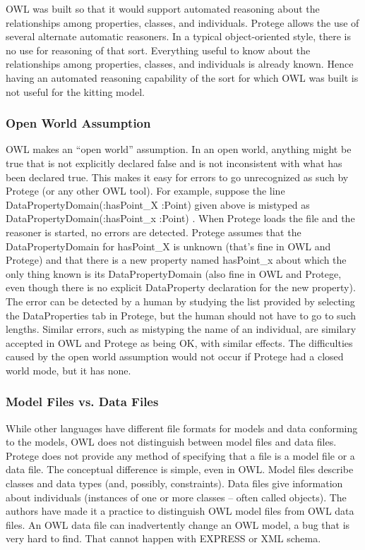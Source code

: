 OWL was built so that it would support automated reasoning about the
relationships among properties, classes, and individuals. Protege allows
the use of several alternate automatic reasoners. In a typical
object-oriented style, there is no use for reasoning of that sort.
Everything useful to know about the relationships among properties,
classes, and individuals is already known. Hence having an automated
reasoning capability of the sort for which OWL was built is not useful
for the kitting model.\\

\subsubsection{Open World Assumption}

OWL makes an ``open world'' assumption.  In an open world, anything might
be true that is not explicitly declared false and is not inconsistent with
what has been declared true. This makes it easy for errors to go
unrecognized as such by Protege (or any other OWL tool). For example,
suppose the line \sf DataPropertyDomain(:hasPoint\_X :Point) \rm given
above is mistyped as \sf DataPropertyDomain(:hasPoint\_x :Point) \rm. When
Protege loads the file and the reasoner is started, no errors are
detected. Protege assumes that the DataPropertyDomain for \sf hasPoint\_X
\rm is unknown (that's fine in OWL and Protege) and that there is a new
property named \sf hasPoint\_x \rm about which the only thing known is its
DataPropertyDomain (also fine in OWL and Protege, even though there is no
explicit DataProperty declaration for the new property). The error can be
detected by a human by studying the list provided by selecting the
DataProperties tab in Protege, but the human should not have to go to such
lengths. Similar errors, such as mistyping the name of an individual, are
similary accepted in OWL and Protege as being OK, with similar effects.
The difficulties caused by the open world assumption would not occur if
Protege had a closed world mode, but it has none.\\

\subsubsection{Model Files vs. Data Files}

While other languages have different file formats for models and
data conforming to the models, OWL does not distinguish between model files
and data files. Protege does not provide any method of specifying that a
file is a model file or a data file. The conceptual difference is simple,
even in OWL. Model files describe classes and data types (and, possibly,
constraints). Data files give information about individuals (instances of
one or more classes -- often called objects). The authors have made it a
practice to distinguish OWL model files from OWL data files. An OWL data
file can inadvertently change an OWL model, a bug that is very hard to
find. That cannot happen with EXPRESS or XML schema.\\

